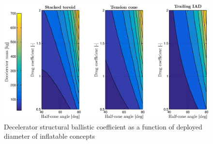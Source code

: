 \begin{figure}[H]
\centering
\includegraphics[width = 1.0\textwidth]{Figure/mass_theta_cd.eps}
\caption{Decelerator structural ballistic coefficient as a function of deployed diameter of inflatable concepts}
\label{fig:mass_theta_cd}
\end{figure}